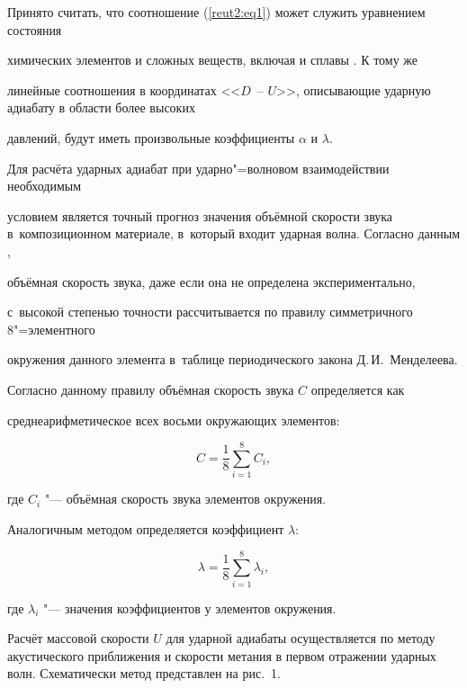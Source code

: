 Принято считать, что соотношение (\ref{reut2:eq1}) может служить уравнением состояния

химических элементов и сложных веществ, включая и сплавы \cite{reut2:bib3}. К тому же

линейные соотношения в координатах <<$D$~-- $U$>>, описывающие ударную адиабату в области более высоких

давлений, будут иметь произвольные коэффициенты $\alpha $ и $\lambda $.







Для расчёта ударных адиабат при ударно"=волновом взаимодействии необходимым

условием является точный прогноз значения объёмной скорости звука в~композиционном материале, в~который входит ударная волна. Согласно данным \cite{reut2:bib4},

 объёмная скорость звука, даже если она не определена экспериментально,

с~высокой степенью точности рассчитывается по правилу симметричного 8"=элементного

окружения данного элемента в~таблице периодического закона Д.\,И.~Менделеева. 

Согласно данному правилу объёмная скорость звука $C$ определяется как

среднеарифметическое всех восьми окружающих элементов:

\[

C=\frac{1}{8} \sum \limits_{i=1}^8 C_i,

\]

где $C_i$ "--- объёмная скорость звука элементов окружения.



Аналогичным методом определяется коэффициент $\lambda$:

\[

\lambda =\frac{1}{8} \sum \limits_{i=1}^8  \lambda_i,

\]

где $\lambda_i$ "--- значения коэффициентов у элементов окружения.



Расчёт массовой скорости $U$ для ударной адиабаты осуществляется по методу акустического приближения и скорости метания в первом отражении ударных волн. Схематически метод представлен на рис.~1.







